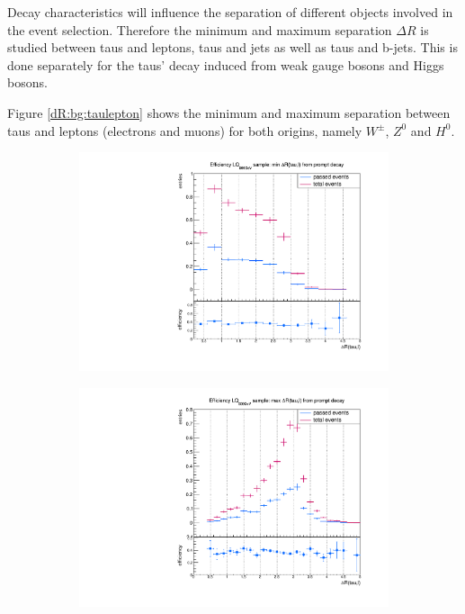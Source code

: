 %
Decay characteristics will influence the separation of different objects involved in the event selection. Therefore the minimum and maximum separation $\Delta R$ is studied between taus and leptons, taus and jets as well as taus and b-jets. This is done separately for the taus' decay induced from weak gauge bosons and Higgs bosons.\par
Figure \ref{dR:bg:taulepton} shows the minimum and maximum separation between taus and leptons (electrons and muons) for both origins, namely $W^\pm$, $Z^0$ and $H^0$.\newline
%
\begin{figure}
  \centering
                \begin{subfigure}[t]{0.49\textwidth}
                \includegraphics[width=\textwidth]{figures/plots/ttH/Divided_pr_mindR_taulepton.pdf}
                \label{dR:bg:prompt:taulepton:min}
                \end{subfigure}
                \begin{subfigure}[t]{0.49\textwidth}
                \includegraphics[width=\textwidth]{figures/plots/ttH/Divided_maxdR_pr_taulepton.pdf}

\end{subfigure}
\end{figure}
